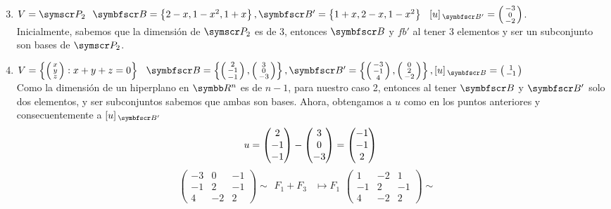 \begin{enumerate}[label=\listAlph]
        \setcounter{enumii}{2}
        \item \(V = \fp_2 \hspace{0.25cm} \fb = \fset{2 - x, 1 - x^2, 1 + x}, \fb' = \fset{1 + x, 2 - x, 1 - x^2} \hspace{0.25cm} \veccoord{u}{\fb'}=\fsmvec{-3,0,-2}\). \\
            Inicialmente, sabemos que la dimensión de \(\fp_2\) es de 3, entonces \(\fb\) y \(fb'\) al tener 3 elementos y ser un subconjunto son bases de \(\fp_2\).
        \setcounter{enumii}{4}
        \item \(V = \fset{\fsmvec{x,y,z}: x + y + z = 0} \hspace{0.25cm} \fb = \fset{\fsmvec{2,-1,-1}, \fsmvec{3,0,-3}}, \fb' = \fset{\fsmvec{-3,-1,4}, \fsmvec{0,2,-2}}, \veccoord{u}{\fb} = \fsmvec{1,-1}\) \\
            Como la dimensión de un hiperplano en \(\realR^n\) es de \(n - 1\), para nuestro caso 2, entonces al tener \(\fb\) y \(\fb'\) solo dos elementos, y ser subconjuntos sabemos que ambas son bases.
            Ahora, obtengamos a \(u\) como en los puntos anteriores y consecuentemente a \(\veccoord{u}{\fb'}\)
            \[
                u = \fvec{2,-1,-1} - \fvec{3,0,-3} = \fvec{-1,-1,2}
            \]
            \[
                \left(
                \begin{array}{cc|c}
                    -3 & 0 & -1 \\
                    -1 & 2 & -1  \\
                    4 & -2 & 2
                \end{array}
                \right)
                \sim
                \begin{aligned}
                    F_1 + F_3 &\mapsto F_1
                \end{aligned}
                \left(
                \begin{array}{cc|c}
                    1 & -2 & 1 \\
                    -1 & 2 & -1  \\
                    4 & -2 & 2
                \end{array}
                \right)
                \sim
                \begin{aligned}

\end{aligned}\]
\end{enumerate}
